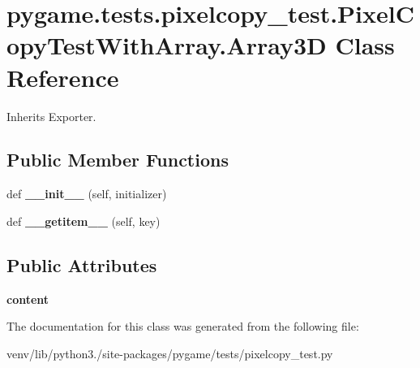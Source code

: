 \hypertarget{classpygame_1_1tests_1_1pixelcopy__test_1_1_pixel_copy_test_with_array_1_1_array3_d}{}\section{pygame.\+tests.\+pixelcopy\+\_\+test.\+Pixel\+Copy\+Test\+With\+Array.\+Array3D Class Reference}
\label{classpygame_1_1tests_1_1pixelcopy__test_1_1_pixel_copy_test_with_array_1_1_array3_d}


Inherits Exporter.

\subsection*{Public Member Functions}
\begin{DoxyCompactItemize}
\item 
\mbox{\label{classpygame_1_1tests_1_1pixelcopy__test_1_1_pixel_copy_test_with_array_1_1_array3_d_ac35336046422b39d1f0b91d32c3833f9}} 
def {\bfseries \+\_\+\+\_\+init\+\_\+\+\_\+} (self, initializer)
\item 
\mbox{\label{classpygame_1_1tests_1_1pixelcopy__test_1_1_pixel_copy_test_with_array_1_1_array3_d_a433af893be94d6203c510a85b2ff85f0}} 
def {\bfseries \+\_\+\+\_\+getitem\+\_\+\+\_\+} (self, key)
\end{DoxyCompactItemize}
\subsection*{Public Attributes}
\begin{DoxyCompactItemize}
\item 
\mbox{\label{classpygame_1_1tests_1_1pixelcopy__test_1_1_pixel_copy_test_with_array_1_1_array3_d_afd56db77d32c6bab798d33601f957174}} 
{\bfseries content}
\end{DoxyCompactItemize}


The documentation for this class was generated from the following file\+:\begin{DoxyCompactItemize}
\item 
venv/lib/python3./site-\/packages/pygame/tests/pixelcopy\+\_\+test.\+py\end{DoxyCompactItemize}
